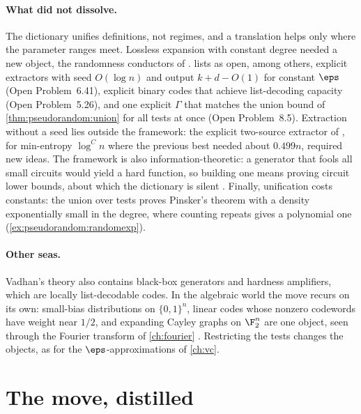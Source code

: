 \begin{refsection}
\paragraph{What did not dissolve.} The dictionary unifies definitions, not regimes, and a translation helps only where the parameter ranges meet. Lossless expansion with constant degree needed a new object, the randomness conductors of \textcite{CapalboReingoldVadhanWigderson2002}. \Textcite{Vadhan2012} lists as open, among others, explicit extractors with seed $O(\log n)$ and output $k+d-O(1)$ for constant $\eps$ (Open Problem~6.41), explicit binary codes that achieve list-decoding capacity (Open Problem~5.26), and one explicit $\Gamma$ that matches the union bound of \cref{thm:pseudorandom:union} for all tests at once (Open Problem~8.5). Extraction without a seed lies outside the framework: the explicit two-source extractor of \textcite{ChattopadhyayZuckerman2019}, for min-entropy $\log^Cn$ where the previous best needed about $0.499n$, required new ideas. The framework is also information-theoretic: a generator that fools all small circuits would yield a hard function, so building one means proving circuit lower bounds, about which the dictionary is silent \parencite[\S7]{Vadhan2012}. Finally, unification costs constants: the union over tests proves Pinsker's theorem with a density exponentially small in the degree, where counting repeats gives a polynomial one (\cref{ex:pseudorandom:randomexp}).

\paragraph{Other seas.} Vadhan's theory also contains black-box generators and hardness amplifiers, which are locally list-decodable codes. In the algebraic world the move recurs on its own: small-bias distributions on $\{0,1\}^n$, linear codes whose nonzero codewords have weight near $1/2$, and expanding Cayley graphs on $\F_2^n$ are one object, seen through the Fourier transform of \cref{ch:fourier} \parencite[\S8.2.5]{Vadhan2012}. Restricting the tests changes the objects, as for the $\eps$-approximations of \cref{ch:vc}.

\section{The move, distilled}\label{sec:pseudorandom:distilled}


\end{refsection}
